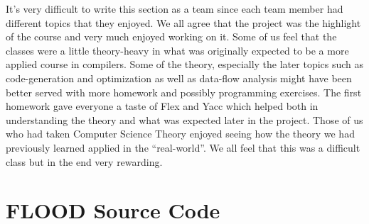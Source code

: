 \documentclass[12pt]{report}
\begin{document}
It’s very difficult to write this section as a team since each team member had different topics that they enjoyed. We all agree that the project was the highlight of the course and very much enjoyed working on it. Some of us feel that the classes were a little theory-heavy in what was originally expected to be a more applied course in compilers. Some of the theory, especially the later topics such as code-generation and optimization as well as data-flow analysis might have been better served with more homework and possibly programming exercises. The first homework gave everyone a taste of Flex and Yacc which helped both in understanding the theory and what was expected later in the project. Those of us who had taken Computer Science Theory enjoyed seeing how the theory we had previously learned applied in the “real-world”. We all feel that this was a difficult class but in the end very rewarding.

\appendix
\chapter{FLOOD Source Code}
\end{document}
